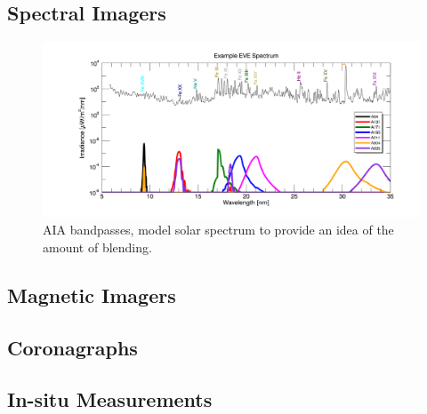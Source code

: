 \subsection{Spectral Imagers}

\begin{figure}[!h]
    \begin{center}
	    \includegraphics[width=166mm]{Images/AiaBandpasses.png}
    \end{center}
    \caption[AIA bandpasses]{
	    AIA bandpasses, model solar spectrum to provide an idea of the amount of blending. 
	}
    \label{aiabandpasses}
\end{figure}

\subsection{Magnetic Imagers}

\subsection{Coronagraphs}

\subsection{In-situ Measurements}



